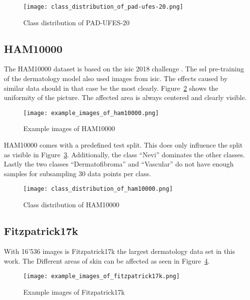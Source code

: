 \begin{figure}[H]
    \begin{center}
    \texttt{[image: class\_distribution\_of\_pad-ufes-20.png]}
    \caption{Class distribution of PAD-UFES-20}\label{fig:class_distribution_of_pad-ufes-20}
    \end{center}
\end{figure}


\subsection{HAM10000}
The HAM10000 dataset is based on the \gls{isic} 2018 challenge \autocite{codella2019}. The \gls{ssl} pre-training of the dermatology model also used images from \gls{isic}. The effects caused by similar data should in that case be the most clearly.
Figure~\ref{fig:example_images_of_ham10000} shows the uniformity of the picture. The affected area is always centered and clearly visible.
\begin{figure}[H]
    \begin{center}
    \texttt{[image: example\_images\_of\_ham10000.png]}
    \caption{Example images of HAM10000}\label{fig:example_images_of_ham10000}
    \end{center}
\end{figure}
HAM10000 comes with a predefined test split. This does only influence the split as visible in Figure~\ref{fig:class_distribution_of_ham10000}.
Additionally, the class ``Nevi'' dominates the other classes. Lastly the two classes ``Dermatofibroma'' and ``Vascular'' do not have enough samples for subsampling 30 data points per class.
\begin{figure}[H]
    \begin{center}
    \texttt{[image: class\_distribution\_of\_ham10000.png]}
    \caption{Class distribution of HAM10000}\label{fig:class_distribution_of_ham10000}
    \end{center}
\end{figure}


\subsection{Fitzpatrick17k}
With 16'536 images is Fitzpatrick17k the largest dermatology data set in this work. The Different areas of skin can be affected as seen in Figure~\ref{fig:example_images_of_fitzpatrick17k}.

\begin{figure}[H]
    \begin{center}
    \texttt{[image: example\_images\_of\_fitzpatrick17k.png]}
    \caption{Example images of Fitzpatrick17k}\label{fig:example_images_of_fitzpatrick17k}
    \end{center}
\end{figure}

